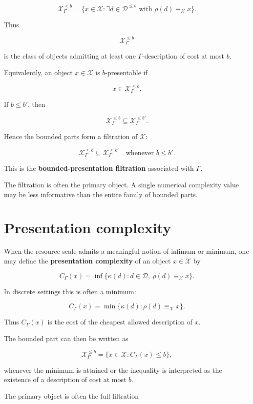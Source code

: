 \documentclass[11pt]{article}
\begin{document}
\[
\mathcal X_\Gamma^{\leq b}
=
\{x\in\mathcal X:\exists d\in\mathcal D^{\leq b}
\text{ with }\rho(d)\equiv_\mathcal X x\}.
\]

Thus

\[
\mathcal X_\Gamma^{\leq b}
\]

is the class of objects admitting at least one \(\Gamma\)-description of cost at most \(b\).

Equivalently, an object \(x\in\mathcal X\) is \(b\)-presentable if

\[
x\in \mathcal X_\Gamma^{\leq b}.
\]

If \(b\leq b'\), then

\[
\mathcal X_\Gamma^{\leq b}\subseteq \mathcal X_\Gamma^{\leq b'}.
\]

Hence the bounded parts form a filtration of \(\mathcal X\):

\[
\mathcal X_\Gamma^{\leq b}
\subseteq
\mathcal X_\Gamma^{\leq b'}
\quad
\text{whenever }b\leq b'.
\]

This is the \textbf{bounded-presentation filtration} associated with \(\Gamma\).

The filtration is often the primary object. A single numerical complexity value may be less informative than the entire family of bounded parts.


\section{Presentation complexity}

When the resource scale admits a meaningful notion of infimum or minimum, one may define the \textbf{presentation complexity} of an object \(x\in\mathcal X\) by

\[
C_\Gamma(x)=\inf\{\kappa(d): d\in\mathcal D,\ \rho(d)\equiv_\mathcal X x\}.
\]

In discrete settings this is often a minimum:

\[
C_\Gamma(x)=\min\{\kappa(d):\rho(d)\equiv_\mathcal X x\}.
\]

Thus \(C_\Gamma(x)\) is the cost of the cheapest allowed description of \(x\).

The bounded part can then be written as

\[
\mathcal X_\Gamma^{\leq b}=\{x\in\mathcal X:C_\Gamma(x)\leq b\},
\]

whenever the minimum is attained or the inequality is interpreted as the existence of a description of cost at most \(b\).

The primary object is often the full filtration
\end{document}
